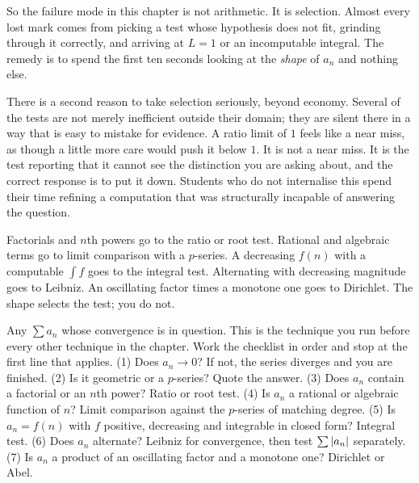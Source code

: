 So the failure mode in this chapter is not arithmetic. It is selection. Almost every lost mark comes from picking a test whose hypothesis does not fit, grinding through it correctly, and arriving at $L=1$ or an incomputable integral. The remedy is to spend the first ten seconds looking at the \emph{shape} of $a_n$ and nothing else.

There is a second reason to take selection seriously, beyond economy. Several of the tests are not merely inefficient outside their domain; they are silent there in a way that is easy to mistake for evidence. A ratio limit of $1$ feels like a near miss, as though a little more care would push it below $1$. It is not a near miss. It is the test reporting that it cannot see the distinction you are asking about, and the correct response is to put it down. Students who do not internalise this spend their time refining a computation that was structurally incapable of answering the question.

\begin{keynote}
Factorials and $n$th powers go to the ratio or root test. Rational and algebraic terms go to limit comparison with a $p$-series. A decreasing $f(n)$ with a computable $\int f$ goes to the integral test. Alternating with decreasing magnitude goes to Leibniz. An oscillating factor times a monotone one goes to Dirichlet. The shape selects the test; you do not.
\end{keynote}

\cue Any $\sum a_n$ whose convergence is in question. This is the technique you run before every other technique in the chapter.
\method Work the checklist in order and stop at the first line that applies. (1) Does $a_n\to0$? If not, the series diverges and you are finished. (2) Is it geometric or a $p$-series? Quote the answer. (3) Does $a_n$ contain a factorial or an $n$th power? Ratio or root test. (4) Is $a_n$ a rational or algebraic function of $n$? Limit comparison against the $p$-series of matching degree. (5) Is $a_n=f(n)$ with $f$ positive, decreasing and integrable in closed form? Integral test. (6) Does $a_n$ alternate? Leibniz for convergence, then test $\sum\left\lvert a_n\right\rvert$ separately. (7) Is $a_n$ a product of an oscillating factor and a monotone one? Dirichlet or Abel.

